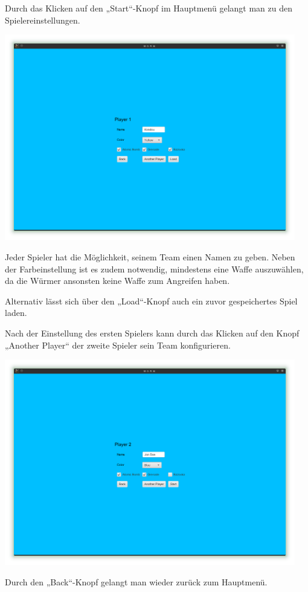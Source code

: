 \documentclass{scrreprt}
\begin{document}
Durch das Klicken auf den „Start“-Knopf im Hauptmenü gelangt man zu den Spielereinstellungen.

\includegraphics[height=9cm]{Screenshot5.png}

Jeder Spieler hat die Möglichkeit, seinem Team einen Namen zu geben.
Neben der Farbeinstellung ist es zudem notwendig, mindestens eine Waffe auszuwählen, da die Würmer ansonsten keine Waffe zum Angreifen haben.

Alternativ lässt sich über den „Load“-Knopf auch ein zuvor gespeichertes Spiel laden.

Nach der Einstellung des ersten Spielers kann durch das Klicken auf den Knopf „Another Player“ der zweite Spieler sein Team konfigurieren.

\includegraphics[height=9cm]{Screenshot6.png}

Durch den „Back“-Knopf gelangt man wieder zurück zum Hauptmenü.
\end{document}
